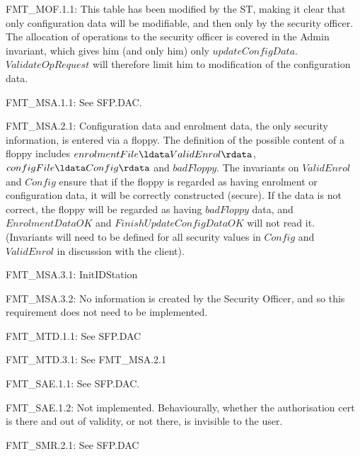 {\footnotesize \sf 
FMT\_MOF.1.1:
}
\newline
	This table has been modified by the ST, making it clear that
	only configuration data will be modifiable, and then only by
	the security officer. The allocation of operations to the
	security officer is covered in the Admin invariant, which
	gives him (and only him) only
	$updateConfigData$. $ValidateOpRequest$ will therefore limit him
	to modification of the configuration data. 

{\footnotesize \sf 
FMT\_MSA.1.1:
}
\newline
	See SFP.DAC.

{\footnotesize \sf 
FMT\_MSA.2.1:
}
\newline
	Configuration data and enrolment data, the only security
	information, is entered via a floppy. The definition of the
	possible content of a floppy includes 
	$enrolmentFile \ldata ValidEnrol \rdata$, $configFile \ldata
	Config \rdata$ and $badFloppy$. The invariants on
	$ValidEnrol$ and $Config$ ensure that if the floppy is regarded as
	having enrolment or configuration data, it will be correctly
	constructed (secure). If the data is not correct, the floppy
	will be regarded as having $badFloppy$ data, and $EnrolmentDataOK$
	and $FinishUpdateConfigDataOK$ will not read it. (Invariants
	will need to be defined for all security values in $Config$
	and $ValidEnrol$ in discussion with the client).

{\footnotesize \sf 
FMT\_MSA.3.1:
}
\newline
	InitIDStation

{\footnotesize \sf 
FMT\_MSA.3.2:
}
\newline
	No information is created by the Security Officer, and so this requirement does not need to be implemented.

{\footnotesize \sf 
FMT\_MTD.1.1:
}
\newline
	See SFP.DAC

{\footnotesize \sf 
FMT\_MTD.3.1:
}
\newline
	See FMT\_MSA.2.1

{\footnotesize \sf 
FMT\_SAE.1.1:
}
\newline
        See SFP.DAC.

{\footnotesize \sf 
FMT\_SAE.1.2:
}
\newline
	Not implemented. Behaviourally, whether the authorisation cert is there and out of validity, or not there, is invisible to the user.

{\footnotesize \sf 
FMT\_SMR.2.1:
}
\newline
	See SFP.DAC

